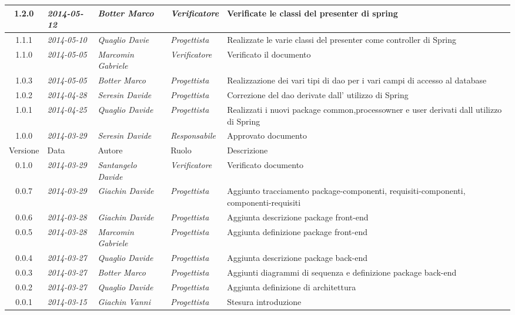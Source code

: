 \begin{small}
\begin{tabular}{|c|p{1.8cm}|p{2.8cm}|p{2.8cm}|p{3.5cm}|}
\hline
1.2.0 & \textit{2014-05-12} & 
\textit{Botter Marco} &
\textit{Verificatore} & Verificate le classi del presenter di spring\\
\hline
1.1.1 & \textit{2014-05-10} & 
\textit{Quaglio Davie} &
\textit{Progettista} & Realizzate le varie classi del presenter come controller di Spring\\
\hline
1.1.0 & \textit{2014-05-05} & 
\textit{Marcomin Gabriele} &
\textit{Verificatore} & Verificato il documento\\
\hline
1.0.3 & \textit{2014-05-05} & 
\textit{Botter Marco} &
\textit{Progettista} & Realizzazione dei vari tipi di dao per i vari campi di accesso al database\\
\hline
1.0.2 & \textit{2014-04-28} & 
\textit{Seresin Davide} &
\textit{Progettista} & Correzione del dao derivate dall' utilizzo di Spring\\
\hline
1.0.1 & \textit{2014-04-25} & 
\textit{Quaglio Davide} &
\textit{Progettista} &Realizzati i nuovi package common,processowner e user derivati dall utilizzo di Spring\\
\hline
1.0.0 & \textit{2014-03-29} & 
\textit{Seresin Davide} &
\textit{Responsabile} &Approvato documento\\
\hline
Versione & Data & Autore & Ruolo & Descrizione \\
\hline
0.1.0 & \textit{2014-03-29} & 
\textit{Santangelo Davide} &
\textit{Verificatore} &Verificato documento\\
\hline
0.0.7 & \textit{2014-03-29} & 
\textit{Giachin Davide} &
\textit{Progettista} & Aggiunto tracciamento package-componenti, requisiti-componenti, componenti-requisiti\\
\hline
0.0.6 & \textit{2014-03-28} & 
\textit{Giachin Davide} &
\textit{Progettista} & Aggiunta descrizione package front-end\\
\hline
0.0.5 & \textit{2014-03-28} & 
\textit{Marcomin Gabriele} &
\textit{Progettista} & Aggiunta definizione package front-end\\
\hline
0.0.4 & \textit{2014-03-27} & 
\textit{Quaglio Davide} &
\textit{Progettista} & Aggiunta descrizione package back-end\\
\hline
0.0.3 & \textit{2014-03-27} & 
\textit{Botter Marco} &
\textit{Progettista} & Aggiunti diagrammi di sequenza e definizione package back-end\\
\hline
0.0.2 & \textit{2014-03-27} & 
\textit{Quaglio Davide} &
\textit{Progettista} & Aggiunta definizione di architettura \\
\hline
0.0.1 & \textit{2014-03-15} & 
\textit{Giachin Vanni} &
\textit{Progettista} & Stesura introduzione\\
\hline
\end{tabular}\\
\end{small}